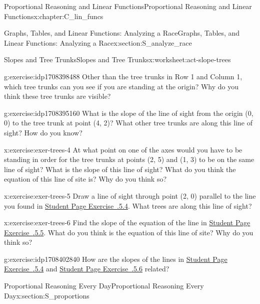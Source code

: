 \documentclass[oneside,10pt,]{book}
\newcommand{\xreffont}{\relax}
\numberwithin{equation}{chapter}
\begin{document}
\begin{chapterptx}{Proportional Reasoning and Linear Functions}{}{Proportional Reasoning and Linear Functions}{}{}{x:chapter:C_lin_funcs}
\begin{sectionptx}{Graphs, Tables, and Linear Functions: Analyzing a Race}{}{Graphs, Tables, and Linear Functions: Analyzing a Race}{}{}{x:section:S_analyze_race}
\begin{worksheet-subsection}{Slopes and Tree Trunks}{}{Slopes and Tree Trunks}{}{}{x:worksheet:act-slope-trees}
\begin{divisionexercise}{2}{}{}{g:exercise:idp1708398488}%
Other than the tree trunks in Row 1 and Column 1, which tree trunks can you see if you are standing at the origin? Why do you think these tree trunks are visible?%
\end{divisionexercise}%
\begin{divisionexercise}{3}{}{}{g:exercise:idp1708395160}%
What is the slope of the line of sight from the origin (0, 0) to the tree trunk at point (4, 2)? What other tree trunks are along this line of sight? How do you know?%
\end{divisionexercise}%
\begin{divisionexercise}{4}{}{}{x:exercise:exer-trees-4}%
At what point on one of the axes would you have to be standing in order for the tree trunks at points (2, 5) and (1, 3) to be on the same line of sight? What is the slope of this line of sight? What do you think the equation of this line of site is? Why do you think so?%
\end{divisionexercise}%
\begin{divisionexercise}{5}{}{}{x:exercise:exer-trees-5}%
Draw a line of sight through point (2, 0) parallel to the line you found in \hyperlink{x:exercise:exer-trees-4}{Student Page Exercise~{\xreffont 2.4.5.4}}. What trees are along this line of sight?%
\end{divisionexercise}%
\begin{divisionexercise}{6}{}{}{x:exercise:exer-trees-6}%
Find the slope of the equation of the line in \hyperlink{x:exercise:exer-trees-5}{Student Page Exercise~{\xreffont 2.4.5.5}}. What do you think is the equation of this line of site? Why do you think so?%
\end{divisionexercise}%
\begin{divisionexercise}{7}{}{}{g:exercise:idp1708402840}%
How are the slopes of the lines in \hyperlink{x:exercise:exer-trees-4}{Student Page Exercise~{\xreffont 2.4.5.4}} and \hyperlink{x:exercise:exer-trees-6}{Student Page Exercise~{\xreffont 2.4.5.6}} related?%
\end{divisionexercise}%
\end{worksheet-subsection}
\restoregeometry
\end{sectionptx}
%
%
\typeout{************************************************}
\typeout{************************************************}
%
\begin{sectionptx}{Proportional Reasoning Every Day}{}{Proportional Reasoning Every Day}{}{}{x:section:S_proportions}

\end{sectionptx}
\end{chapterptx}
\end{document}
